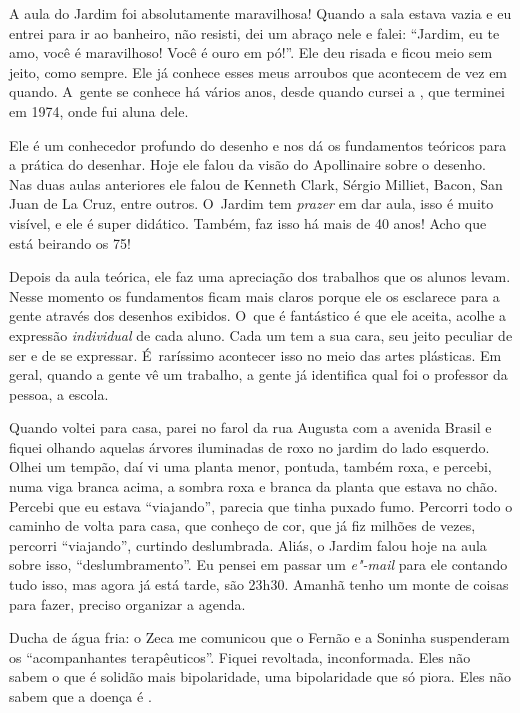 A aula do Jardim foi absolutamente maravilhosa! Quando a sala estava
vazia e eu entrei para ir ao banheiro, não resisti, dei um abraço nele e
falei: ``Jardim, eu te amo, você é maravilhoso! Você é ouro em pó!''.
Ele deu risada e ficou meio sem jeito, como sempre. Ele já conhece esses
meus arroubos que acontecem de vez em quando. A~gente se conhece há
vários anos, desde quando cursei a , que terminei em 1974, onde fui
aluna dele.

Ele é um conhecedor profundo do desenho e nos dá os fundamentos teóricos
para a prática do desenhar. Hoje ele falou da visão do Apollinaire sobre
o desenho. Nas duas aulas anteriores ele falou de Kenneth Clark, Sérgio
Milliet, Bacon, San Juan de La Cruz, entre outros. O~Jardim tem
\emph{prazer} em dar aula, isso é muito visível, e ele é super didático.
Também, faz isso há mais de 40 anos! Acho que está beirando os
75!

Depois da aula teórica, ele faz uma apreciação dos trabalhos que os
alunos levam. Nesse momento os fundamentos ficam mais claros porque ele
os esclarece para a gente através dos desenhos exibidos. O~que é
fantástico é que ele aceita, acolhe a expressão \emph{individual} de
cada aluno. Cada um tem a sua cara, seu jeito peculiar de ser e de se
expressar. É~raríssimo acontecer isso no meio das artes plásticas. Em
geral, quando a gente vê um trabalho, a gente já identifica qual foi o
professor da pessoa, a escola.

Quando voltei para casa, parei no farol da rua Augusta com a avenida
Brasil e fiquei olhando aquelas árvores iluminadas de roxo no jardim do
lado esquerdo. Olhei um tempão, daí vi uma planta menor, pontuda, também
roxa, e percebi, numa viga branca acima, a sombra roxa e branca da
planta que estava no chão. Percebi que eu estava ``viajando'', parecia
que tinha puxado fumo. Percorri todo o caminho de volta para casa, que
conheço de cor, que já fiz milhões de vezes, percorri ``viajando'',
curtindo deslumbrada. Aliás, o Jardim falou hoje na aula sobre isso,
``deslumbramento''. Eu pensei em passar um \emph{e"-mail} para ele
contando tudo isso, mas agora já está tarde, são 23h30. Amanhã
tenho um monte de coisas para fazer, preciso organizar a agenda.

Ducha de água fria: o Zeca me comunicou que o Fernão e a Soninha
suspenderam os ``acompanhantes terapêuticos''. Fiquei revoltada,
inconformada. Eles não sabem o que é solidão mais bipolaridade, uma
bipolaridade que só piora. Eles não sabem que a doença é .

